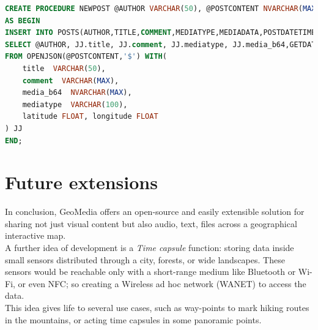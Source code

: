 \documentclass[conference]{IEEEtran}
\begin{document}
\begin{lstlisting}[language=SQL, caption=Stored Procedure of post creation]
CREATE PROCEDURE NEWPOST @AUTHOR VARCHAR(50), @POSTCONTENT NVARCHAR(MAX)
AS BEGIN
INSERT INTO POSTS(AUTHOR,TITLE,COMMENT,MEDIATYPE,MEDIADATA,POSTDATETIME, LATITUDE, LONGITUDE)
SELECT @AUTHOR, JJ.title, JJ.comment, JJ.mediatype, JJ.media_b64,GETDATE(), JJ.latitude ,JJ.longitude 
FROM OPENJSON(@POSTCONTENT,'$') WITH(
	title  VARCHAR(50),
	comment  VARCHAR(MAX),
	media_b64  NVARCHAR(MAX),
	mediatype  VARCHAR(100),
	latitude FLOAT, longitude FLOAT
) JJ
END;
\end{lstlisting}


\section{Future extensions}

In conclusion, GeoMedia offers an open-source and easily extensible solution for sharing not just visual content but also audio, text, files across a geographical interactive map.
\\
A further idea of development is a \textit{Time capsule} function: storing data inside small sensors distributed through a city, forests, or wide landscapes.
These sensors would be reachable only with a short-range medium like Bluetooth or Wi-Fi, or even NFC; so creating a Wireless ad hoc network (WANET) \cite{WANET} to access the data.
\\
This idea gives life to several use cases, such as way-points to mark hiking routes in the mountains, or acting time capsules in some panoramic points.
\end{document}
